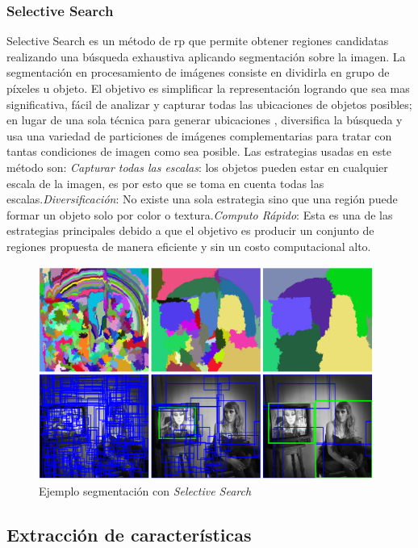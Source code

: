 \subsubsection*{Selective Search} \label{sub:selectivesearch}
Selective Search \citep{selectivesearch} es un método de \ac{rp} que  permite obtener regiones candidatas realizando una búsqueda exhaustiva aplicando segmentación sobre la imagen. La segmentación  en procesamiento de imágenes consiste en dividirla en grupo de píxeles u objeto. El objetivo es simplificar la representación logrando que sea mas significativa, fácil de analizar y capturar todas las ubicaciones de objetos posibles; en lugar de una sola técnica para generar ubicaciones , diversifica la  búsqueda y usa  una variedad de particiones de imágenes complementarias para tratar con tantas condiciones de imagen como sea posible.
Las estrategias usadas en este método son: \textit{Capturar todas las escalas}: los objetos pueden estar en cualquier escala de la imagen, es por esto que se toma en cuenta todas las escalas.\textit{Diversificación}: No existe una sola estrategia sino que una región puede formar un objeto solo por color o textura.\textit{Computo Rápido}: Esta es una de las estrategias principales debido a que el objetivo es producir un conjunto de regiones propuesta de manera eficiente y sin un costo computacional alto.

\begin{figure}[H]
 \centering
  \includegraphics[height=7cm,keepaspectratio=true,clip=true]{imagenes/MarcoTeorico/selectivesearch.png}
  \caption{Ejemplo segmentación con \textit{Selective Search} } %
	\label{Fig: overlapping}
\end{figure}

\subsection{Extracción de características}\label{sub:features-extraction}

